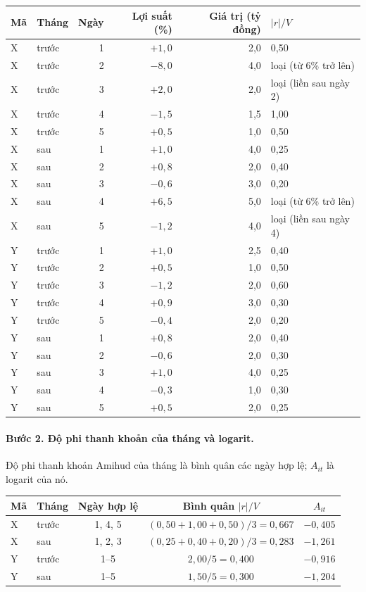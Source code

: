 \begin{center}
{\bangnho
\begin{tabular}{@{}llrrrl@{}}
\toprule
Mã & Tháng & Ngày & Lợi suất (\%) & Giá trị (tỷ đồng) & $|r|/V$\\
\midrule
X & trước & 1 & $+1{,}0$ & 2,0 & 0,50\\
X & trước & 2 & $-8{,}0$ & 4,0 & loại (từ 6\% trở lên)\\
X & trước & 3 & $+2{,}0$ & 2,0 & loại (liền sau ngày 2)\\
X & trước & 4 & $-1{,}5$ & 1,5 & 1,00\\
X & trước & 5 & $+0{,}5$ & 1,0 & 0,50\\
\addlinespace
X & sau & 1 & $+1{,}0$ & 4,0 & 0,25\\
X & sau & 2 & $+0{,}8$ & 2,0 & 0,40\\
X & sau & 3 & $-0{,}6$ & 3,0 & 0,20\\
X & sau & 4 & $+6{,}5$ & 5,0 & loại (từ 6\% trở lên)\\
X & sau & 5 & $-1{,}2$ & 4,0 & loại (liền sau ngày 4)\\
\addlinespace
Y & trước & 1 & $+1{,}0$ & 2,5 & 0,40\\
Y & trước & 2 & $+0{,}5$ & 1,0 & 0,50\\
Y & trước & 3 & $-1{,}2$ & 2,0 & 0,60\\
Y & trước & 4 & $+0{,}9$ & 3,0 & 0,30\\
Y & trước & 5 & $-0{,}4$ & 2,0 & 0,20\\
\addlinespace
Y & sau & 1 & $+0{,}8$ & 2,0 & 0,40\\
Y & sau & 2 & $-0{,}6$ & 2,0 & 0,30\\
Y & sau & 3 & $+1{,}0$ & 4,0 & 0,25\\
Y & sau & 4 & $-0{,}3$ & 1,0 & 0,30\\
Y & sau & 5 & $+0{,}5$ & 2,0 & 0,25\\
\bottomrule
\end{tabular}}
\end{center}

\paragraph{Bước 2. Độ phi thanh khoản của tháng và logarit.}

Độ phi thanh khoản Amihud của tháng là bình quân các ngày hợp lệ; $A_{it}$ là logarit của nó.

\begin{center}
{\bangnho
\begin{tabular}{@{}llccc@{}}
\toprule
Mã & Tháng & Ngày hợp lệ & Bình quân $|r|/V$ & $A_{it}$\\
\midrule
X & trước & 1, 4, 5 & $(0{,}50 + 1{,}00 + 0{,}50)/3 = 0{,}667$ & $-0{,}405$\\
X & sau & 1, 2, 3 & $(0{,}25 + 0{,}40 + 0{,}20)/3 = 0{,}283$ & $-1{,}261$\\
Y & trước & 1--5 & $2{,}00/5 = 0{,}400$ & $-0{,}916$\\
Y & sau & 1--5 & $1{,}50/5 = 0{,}300$ & $-1{,}204$\\
\bottomrule
\end{tabular}}
\end{center}

